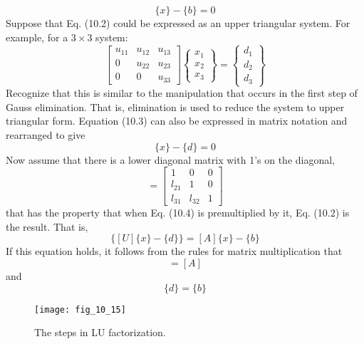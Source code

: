 \documentclass[../main.tex]{subfiles}
\begin{document}
\begin{equation}
[A]\{x\}-\{b\}=0\tag{10.2}
\end{equation}
Suppose that Eq. (10.2) could be expressed as an upper triangular system. For example, for a $3 \times 3$ system:
\begin{equation}
\begin{bmatrix}
u_{11} &u_{12}  &u_{13} \\
0 &u_{22}  &u_{23} \\
0 &0  &u_{33}
\end{bmatrix}
\begin{Bmatrix}
x_{1}\\
x_{2}\\
x_{3}
\end{Bmatrix}=
\begin{Bmatrix}
d_{1}\\
d_{2}\\
d_{3}
\end{Bmatrix}\tag{10.3}
\end{equation}
Recognize that this is similar to the manipulation that occurs in the first step of Gauss elimination. That is, elimination is used to reduce the system to upper triangular form. Equation (10.3) can also be expressed in matrix notation and rearranged to give
\begin{equation}
[U]\{x\}-\{d\}=0\tag{10.4}
\end{equation}
Now assume that there is a lower diagonal matrix with 1's on the diagonal,
\begin{equation}
[L]=
\begin{bmatrix}
1 &0  &0 \\
l_{21} &1  &0 \\
l_{31} &l_{32}  &1
\end{bmatrix}\tag{10.5}
\end{equation}
that has the property that when Eq. (10.4) is premultiplied by it, Eq. (10.2) is the result. That is,
\begin{equation}
[L]\{[U]\{x\}-\{d\}\}=[A]\{x\}-\{b\}\tag{10.6}
\end{equation}
If this equation holds, it follows from the rules for matrix multiplication that
\begin{equation}
[L][U]=[A]\tag{10.7}
\end{equation}
and
\begin{equation}
[L]\{d\}=\{b\}\tag{10.8}
\end{equation}

\begin{figure}[H]
	\centering
	\texttt{[image: fig\_10\_15]}
	\caption{\textsf{The steps in LU factorization.}}
	\label{fig:fig_10_15}
\end{figure}
\end{document}
